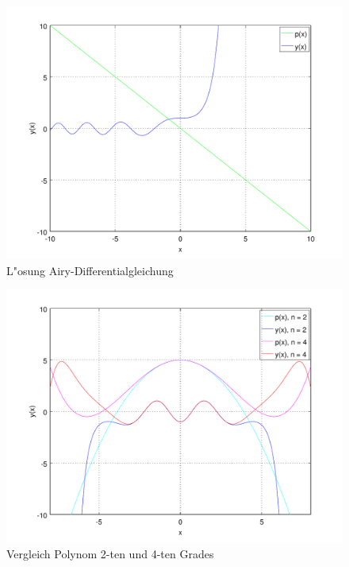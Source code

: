 \begin{figure}
	\includegraphics[width=1\hsize]{./wellen/images/allgemein/n1.pdf}
	\caption{L"osung Airy-Differentialgleichung}
	\label{fig:wellen:airy-dgl}
\end{figure}

\begin{figure}
	\includegraphics[width=1\hsize]{./wellen/images/allgemein/n4.pdf}
	\caption{Vergleich Polynom 2-ten und 4-ten Grades}
	\label{fig:wellen:poly4-dgl}
\end{figure}
